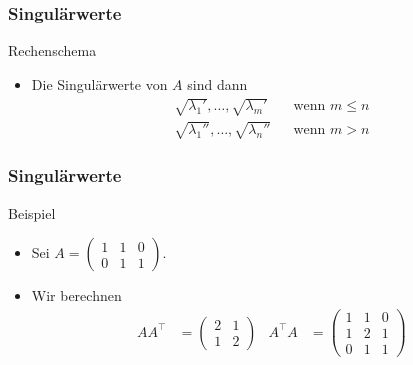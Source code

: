 \documentclass{beamer}
\newcommand{\trans}{\top}
\renewcommand{\ae}{\"a}
\newcommand{\mytitle}{Singul\ae rwerte}
\begin{document}
\begin{frame}\frametitle{\mytitle}
	\begin{block}{Rechenschema}
	\begin{itemize}
	\item Die Singul\ae rwerte von $A$ sind dann
		\begin{align*}
			\sqrt{\lambda_1'},\ldots,\sqrt{\lambda_m'}&&\mbox{wenn }m\leq n\\
			\sqrt{\lambda_1''},\ldots,\sqrt{\lambda_n''}&&\mbox{wenn }m> n
		\end{align*}
	\end{itemize}
	\end{block}
\end{frame}

\begin{frame}\frametitle{\mytitle}
	\begin{block}{Beispiel}
	\begin{itemize}
		\item Sei $ A=\begin{pmatrix} 1&1&0\\0&1&1 \end{pmatrix}. $
		\item Wir berechnen
			\begin{align*}
				AA^\trans&=\begin{pmatrix}2&1\\1&2\end{pmatrix}&
				A^\trans A&=\begin{pmatrix}1&1&0\\1&2&1\\0&1&1\end{pmatrix}
			\end{align*}
	\end{itemize}
	\end{block}
\end{frame}
\end{document}
